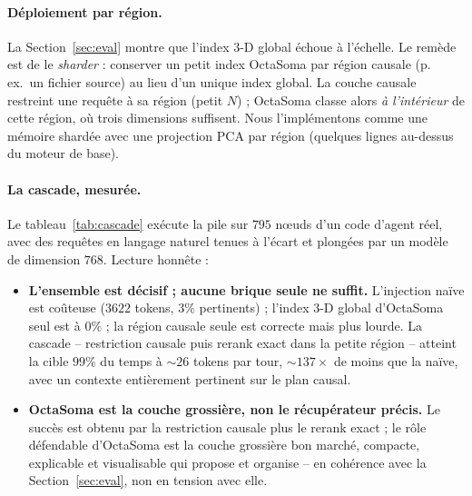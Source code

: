 \documentclass[11pt]{article}
\begin{document}
\paragraph{Déploiement par région.} La Section~\ref{sec:eval} montre que l'index 3-D
global échoue à l'échelle. Le remède est de le \emph{sharder} : conserver un petit
index OctaSoma par région causale (p.\,ex.\ un fichier source) au lieu d'un unique
index global. La couche causale restreint une requête à sa région (petit $N$) ;
OctaSoma classe alors \emph{à l'intérieur} de cette région, où trois dimensions
suffisent. Nous l'implémentons comme une mémoire shardée avec une projection PCA par
région (quelques lignes au-dessus du moteur de base).

\paragraph{La cascade, mesurée.} Le tableau~\ref{tab:cascade} exécute la pile sur
$795$ n\oe{}uds d'un code d'agent réel, avec des requêtes en langage naturel tenues à
l'écart et plongées par un modèle de dimension $768$. Lecture honnête :
\begin{itemize}
  \item \textbf{L'ensemble est décisif ; aucune brique seule ne suffit.} L'injection
  naïve est coûteuse ($3622$ tokens, $3\%$ pertinents) ; l'index 3-D global
  d'OctaSoma seul est à $0\%$ ; la région causale seule est correcte mais plus lourde.
  La cascade -- restriction causale puis rerank exact dans la petite région --
  atteint la cible $99\%$ du temps à ${\sim}26$ tokens par tour, ${\sim}137\times$ de
  moins que la naïve, avec un contexte entièrement pertinent sur le plan causal.
  \item \textbf{OctaSoma est la couche grossière, non le récupérateur précis.} Le
  succès est obtenu par la restriction causale plus le rerank exact ; le rôle
  défendable d'OctaSoma est la couche grossière bon marché, compacte, explicable et
  visualisable qui propose et organise -- en cohérence avec la Section~\ref{sec:eval},
  non en tension avec elle.
\end{itemize}
\end{document}
